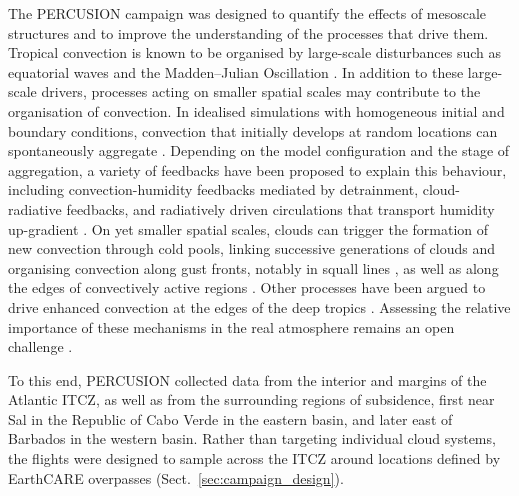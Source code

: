 \documentclass[acp, manuscript]{copernicus}
\begin{document}
The PERCUSION campaign was designed to quantify the effects of mesoscale structures and to improve the understanding of the processes that drive them. Tropical convection is known to be organised by large-scale disturbances such as equatorial waves \citep[e.g.,][]{n.takayabuLargeScaleCloudDisturbances1994} and the Madden--Julian Oscillation \citep{maddenDetection4050Day1971, maddenDescriptionGlobalScaleCirculation1972}.
In addition to these large-scale drivers, processes acting on smaller spatial scales may contribute to the organisation of convection.
In idealised simulations with homogeneous initial and boundary conditions, convection that initially develops at random locations can spontaneously aggregate \citep{nakajimaNumericalExperimentsConcerning1988, Bretherton2005}. Depending on the model configuration and the stage of aggregation, a variety of feedbacks have been proposed to explain this behaviour, including convection-humidity feedbacks mediated by detrainment, cloud-radiative feedbacks, and radiatively driven circulations that transport humidity up-gradient \citep[reviewed by][]{Wing2017}.
On yet smaller spatial scales, clouds can trigger the formation of new convection through cold pools, linking successive generations of clouds and organising convection along gust fronts, notably in squall lines \citep{Rotunno1988, Weisman2004}, as well as along the edges of convectively active regions \citep{Nolan2016, windmillerConvectionEdge2019}.
Other processes have been argued to drive enhanced convection at the edges of the deep tropics \citep{masunagaRadiativeInvigorationTropical2018, masunagaEdgeIntensificationEastern2023}.
Assessing the relative importance of these mechanisms in the real atmosphere remains an open challenge \citep{mullerSpontaneousAggregationConvective2022}.

To this end, PERCUSION collected data from the interior and margins of the Atlantic ITCZ, as well as from the surrounding regions of subsidence, first near Sal in the Republic of Cabo Verde in the eastern basin, and later east of Barbados in the western basin. Rather than targeting individual cloud systems, the flights were designed to sample across the ITCZ around locations defined by EarthCARE overpasses (Sect.~\ref{sec:campaign_design}).
\end{document}
